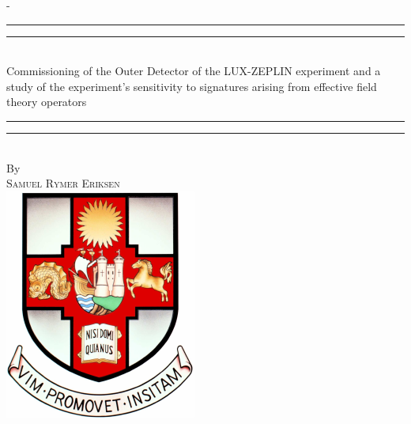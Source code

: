 %
%
% 
%
%
\begin{titlingpage}
\begin{SingleSpace}
\calccentering{\unitlength} 
\begin{adjustwidth*}{\unitlength}{-\unitlength}
\vspace*{13mm}
\begin{center}
\rule[0.5ex]{\linewidth}{2pt}\vspace*{-\baselineskip}\vspace*{3.2pt}
\rule[0.5ex]{\linewidth}{1pt}\\[\baselineskip]
{\HUGE Commissioning of the Outer Detector of the LUX-ZEPLIN experiment and a study of the experiment's sensitivity to signatures arising from effective field theory operators }\\[4mm]
\rule[0.5ex]{\linewidth}{1pt}\vspace*{-\baselineskip}\vspace{3.2pt}
\rule[0.5ex]{\linewidth}{2pt}\\
\vspace{6.5mm}
{\large By}\\
\vspace{6.5mm}
{\large\textsc{Samuel Rymer Eriksen}}\\
\vspace{11mm}
\includegraphics[scale=0.6]{Figures/Logos/bristolcrest_colour.pdf}\\

\end{center}
\end{adjustwidth*}
\end{SingleSpace}
\end{titlingpage}
